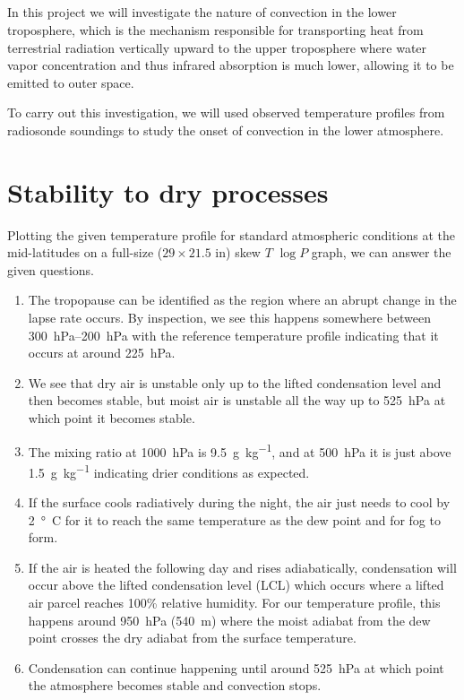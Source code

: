 \documentclass[11pt]{article}
\title{\spacedlowsmallcaps{\small 12.818: Introduction to Atmospheric Data and Large-scale Dynamics}\\ \spacedlowsmallcaps{\Large Project three: Convection and atmospheric thermodynamics}}
\author{\spacedlowsmallcaps{Ali Ramadhan}}
\date{}
\begin{document}
\maketitle

In this project we will investigate the nature of convection in the lower troposphere, which is the mechanism responsible for transporting heat from terrestrial radiation vertically upward to the upper troposphere where water vapor concentration and thus infrared absorption is much lower, allowing it to be emitted to outer space.

To carry out this investigation, we will used observed temperature profiles from radiosonde soundings to study the onset of convection in the lower atmosphere.

\section{Stability to dry processes}
Plotting the given temperature profile for standard atmospheric conditions at the mid-latitudes on a full-size ($29\times21.5$ in) skew $T$ $\log P$ graph, we can answer the given questions.
\begin{enumerate}
	\item The tropopause can be identified as the region where an abrupt change in the lapse rate occurs. By inspection, we see this happens somewhere between \SIrange{300}{200}{\hecto\Pa} with the reference temperature profile indicating that it occurs at around \SI{225}{\hecto\Pa}.
	\item We see that dry air is unstable only up to the lifted condensation level and then becomes stable, but moist air is unstable all the way up to \SI{525}{\hecto\Pa} at which point it becomes stable.
	\item The mixing ratio at \SI{1000}{\hecto\Pa} is \SI{9.5}{\g\per\kg}, and at \SI{500}{\hecto\Pa} it is just above \SI{1.5}{\g\per\kg} indicating drier conditions as expected.
	\item If the surface cools radiatively during the night, the air just needs to cool by \SI{2}{\degree C} for it to reach the same temperature as the dew point and for fog to form.
	\item If the air is heated the following day and rises adiabatically, condensation will occur above the lifted condensation level (LCL) which occurs where a lifted air parcel reaches 100\% relative humidity. For our temperature profile, this happens around \SI{950}{\hecto\Pa} (\SI{540}{\m}) where the moist adiabat from the dew point crosses the dry adiabat from the surface temperature.
	\item Condensation can continue happening until around \SI{525}{\hecto\Pa} at which point the atmosphere becomes stable and convection stops.
\end{enumerate}
\end{document}

